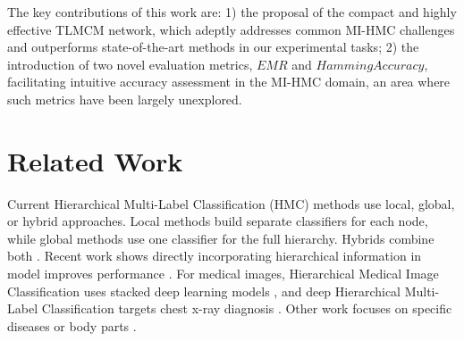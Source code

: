 \documentclass[wcp]{jmlr}
\begin{document}
The key contributions of this work are: 1) the proposal of the compact and highly effective TLMCM network, which adeptly addresses common MI-HMC challenges and outperforms state-of-the-art methods in our experimental tasks; 2) the introduction of two novel evaluation metrics, $EMR$ and $HammingAccuracy$, facilitating intuitive accuracy assessment in the MI-HMC domain, an area where such metrics have been largely unexplored. 
\section{Related Work}
Current Hierarchical Multi-Label Classification (HMC) methods use local, global, or hybrid approaches. Local methods build separate classifiers for each node, while global methods use one classifier for the full hierarchy. Hybrids combine both \cite{pmlr-v80-wehrmann18a}. Recent work shows directly incorporating hierarchical information in model improves performance \cite{Giunchiglia01}. %
 For medical images, Hierarchical Medical Image Classification uses stacked deep learning models \cite{Kowsari01}, and deep Hierarchical Multi-Label Classification targets chest x-ray diagnosis \cite{Chen01}. Other work focuses on specific diseases \cite{Gour01} or body parts \cite{Hou01}.
\end{document}
